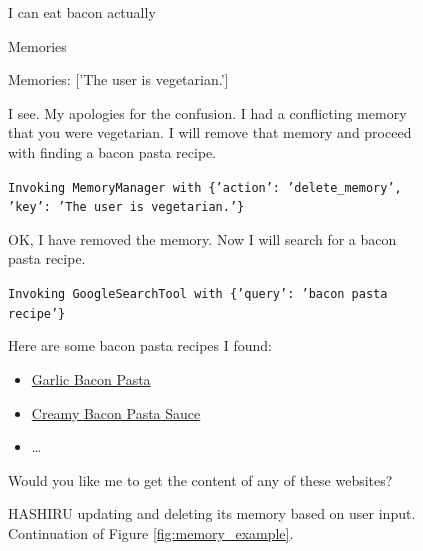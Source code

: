 \documentclass[conference]{IEEEtran}
\begin{document}
\begin{figure}[ht]
    \centering
    \begin{minipage}
    {0.45\textwidth}
    \begin{userbox}
        I can eat bacon actually
        \end{userbox}
        
        \begin{assistantbox}
        Memories
        
        Memories: [’The user is vegetarian.’]
        
        I see. My apologies for the confusion. I had a conflicting memory that you were vegetarian. I will remove that memory and proceed with finding a bacon pasta recipe.
        
        \texttt{Invoking MemoryManager with \{'action': 'delete\_memory', 'key': 'The user is vegetarian.'\}}
        
        OK, I have removed the memory. Now I will search for a bacon pasta recipe.
        
        \texttt{Invoking GoogleSearchTool with \{'query': 'bacon pasta recipe'\}}
        
        Here are some bacon pasta recipes I found:
        \begin{itemize}
            \item \href{https://www.sprinklesandsprouts.com/garlic-bacon-pasta/}{Garlic Bacon Pasta}
            \item \href{https://www.theburntbuttertable.com/creamy-bacon-pasta-sauce/}{Creamy Bacon Pasta Sauce}
            \item \dots
        \end{itemize}
        
        Would you like me to get the content of any of these websites?
        \end{assistantbox}
    \end{minipage}
    \caption{HASHIRU updating and deleting its memory based on user input. Continuation of Figure \ref{fig:memory_example}.}
    \label{fig:memory_example2}
\end{figure}


    
\end{document}
